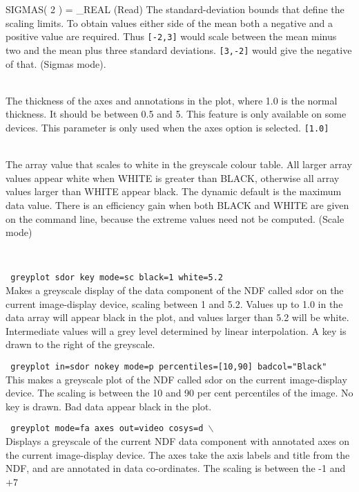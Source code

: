 \documentclass[twoside,11pt]{article}
\newcommand{\htmlref}[2]{#1}
\newcommand{\sstexamples}[1]{
   \goodbreak
   \item[Examples:] \mbox{} \\
   \vspace{-3.5ex}
   \begin{description}
      #1
   \end{description}
}
\newcommand{\sstsubsection}[1]{ \item[{#1}] \mbox{} \\}
\newcommand{\sstexamplesubsection}[2]{\sloppy \item{\ssttt #1} \mbox{} \\ #2 }
\newcommand{\ssttt}{\tt}
\newcommand{\sstexamples}[1]{%
      \item[\htmlref{Examples:}{ap:example}]%
      \begin{description}
         #1
      \end{description}
   }
\newcommand{\sstsubsection}[1]{\item[{#1}]}
\newcommand{\sstexamplesubsection}[2]{%
      \item[{\ssttt #1}]
      #2\smallskip%
   }
\begin{document}
{{{         SIGMAS( 2 ) = \_REAL (Read)
      }{
         The standard-deviation bounds that define the scaling limits.
         To obtain values either side of the mean both a negative and
         a positive value are required.  Thus {\tt [-2,3]} would scale
         between the mean minus two and the mean plus three standard
         deviations.  {\tt [3,-2]} would give the negative of that. (Sigmas
         mode).
      }
      \sstsubsection{
         THICK = \_REAL (Read)
      }{
         The thickness of the axes and annotations in the plot, where
         1.0 is the normal thickness.  It should be between 0.5 and 5.
         This feature is only available on some devices.   This
         parameter is only used when the axes option is selected. {\tt [1.0]}
      }
      \sstsubsection{
         WHITE = \_DOUBLE (Read)
      }{
         The array value that scales to white in the greyscale
         colour table.  All larger array values appear white when
         WHITE is greater than BLACK, otherwise all array values
         larger than WHITE appear black.  The dynamic default is the
         maximum data value.   There is an efficiency gain when both
         BLACK and WHITE are given on the command line, because the
         extreme values need not be computed.  (Scale mode)
      }
   }
   \sstexamples{
      \sstexamplesubsection{
         greyplot sdor key mode=sc black=1 white=5.2
      }{
         Makes a greyscale display of the data component of the NDF
         called sdor on the current image-display device, scaling
         between 1 and 5.2.  Values up to 1.0 in the data array will
         appear black in the plot, and values larger than 5.2 will be
         white.  Intermediate values will a grey level determined by
         linear interpolation.  A key is drawn to the right of the
         greyscale.
      }
      \sstexamplesubsection{
         greyplot in=sdor nokey mode=p percentiles=[10,90] badcol={\tt "}Black{\tt "}
      }{
         This makes a greyscale plot of the NDF called sdor on the
         current image-display device. The scaling is between the 10 and
         90 per cent percentiles of the image.  No key is drawn.  Bad
         data appear black in the plot.
      }
      \sstexamplesubsection{
         greyplot mode=fa axes out=video cosys=d $\backslash$
      }{
         Displays a greyscale of the current NDF data component with
         annotated axes on the current image-display device.  The axes
         take the axis labels and title from the NDF, and are annotated
         in data co-ordinates.  The scaling is between the -1 and $+$7
}}}
\end{document}

